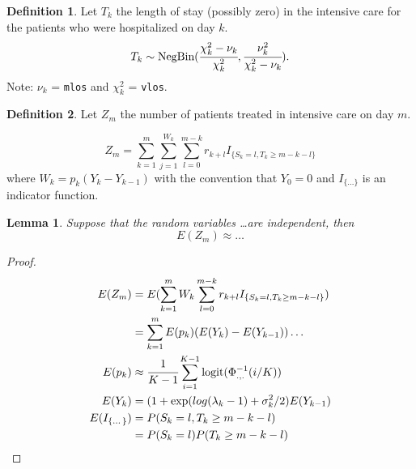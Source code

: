 \documentclass[10pt,twocolumn,a4paper]{article}
\newcommand{\NB}{\text{NegBin}}
\theoremstyle{definition}
\newtheorem{definition}{Definition}
\theoremstyle{remark}
\theoremstyle{plain}
\newtheorem{lemma}{Lemma}
\begin{document}
\begin{definition}

  Let $T_k$ the length of stay (possibly zero) in the intensive care for the
  patients who were hospitalized on day $k$.
  \[ T_k \sim \NB(\cfrac{\chi_k^2-\nu_k}{\chi_k^2},
                  \cfrac{\nu_k^2}{\chi_k^2-\nu_k}). \]
  Note: $\nu_k$ = \verb|mlos| and $\chi_k^2$ = \verb|vlos|.

\end{definition}

\begin{definition}

  Let $Z_m$ the number of patients treated in intensive care on day $m$.

  \[ Z_m = \sum_{k=1}^m \sum_{j=1}^{W_k} \sum_{l=0}^{m-k} r_{k+l}
           I_{\{S_k = l, T_k \ge m-k-l\}} \]
  where $W_k = p_k (Y_k - Y_{k-1})$ with the convention that $Y_0 = 0$ and
  $I_{\{\dots\}}$ is an indicator function.

\end{definition}


\begin{lemma}

  Suppose that the random variables \dots are independent, then
  \[ E(Z_m) \approx \dots \]

\end{lemma}

\begin{proof}

  \begin{align*}
    E(Z_m) &= E(\sum_{k=1}^m W_k \sum_{l=0}^{m-k} r_{k+l}
                I_{\{S_k = l, T_k \ge m-k-l\}}) \\
           &= \sum_{k=1}^m E(p_k) (E(Y_k) - E(Y_{k-1})) \dots \\
    E(p_k) &\approx \cfrac{1}{K-1} \sum_{i=1}^{K-1}
                    \text{logit}(\Phi_{.,.}^{-1}(i/K)) \\
    E(Y_k) &= (1 + \exp(log(\lambda_k-1)+\sigma_k^2/2) E(Y_{k-1}) \\
    E(I_{\{\dots\}}) &= P(S_k = l, T_k \ge m-k-l) \\
                     &= P(S_k = l) P(T_k \ge m-k-l)
  \end{align*}

\end{proof}
\end{document}
